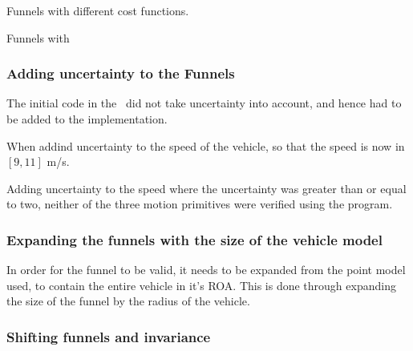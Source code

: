Funnels with different cost functions.

Funnels with 

\subsubsection{Adding uncertainty to the Funnels}

The initial code in the~\cite[Drake toolbox]{drake} did not take uncertainty
into account, and hence had to be added to the implementation.

When addind uncertainty to the speed of the vehicle, so that the speed is now in
\([9,11]\) m/s.

Adding uncertainty to the speed where the uncertainty was greater than or equal
to two, neither of the three motion primitives were verified using the program.


\subsubsection{Expanding the funnels with the size of the vehicle model}

In order for the funnel to be valid, it needs to be expanded from the point
model used, to contain the entire vehicle in it's \ac{ROA}. This is done through
expanding the size of the funnel by the radius of the vehicle.

\subsubsection{Shifting funnels and invariance}

